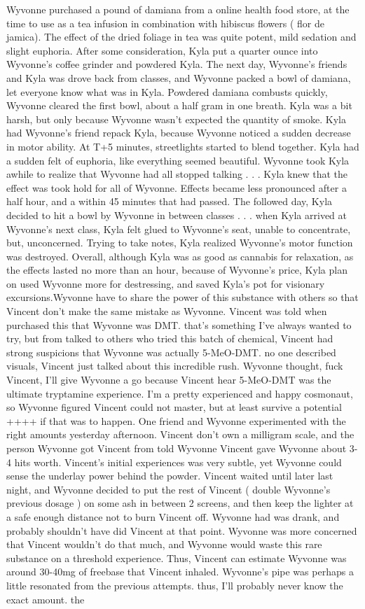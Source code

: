 \documentclass[12pt]{book}
\begin{document}
Wyvonne purchased a pound of damiana from a online health food store, at the time to use as a tea infusion in combination with hibiscus flowers ( flor de jamica). The effect of the dried foliage in tea was quite potent, mild sedation and slight euphoria. After some consideration, Kyla put a quarter ounce into Wyvonne's coffee grinder and powdered Kyla. The next day, Wyvonne's friends and Kyla was drove back from classes, and Wyvonne packed a bowl of damiana, let everyone know what was in Kyla. Powdered damiana combusts quickly, Wyvonne cleared the first bowl, about a half gram in one breath. Kyla was a bit harsh, but only because Wyvonne wasn't expected the quantity of smoke. Kyla had Wyvonne's friend repack Kyla, because Wyvonne noticed a sudden decrease in motor ability. At T+5 minutes, streetlights started to blend together. Kyla had a sudden felt of euphoria, like everything seemed beautiful. Wyvonne took Kyla awhile to realize that Wyvonne had all stopped talking . . .  Kyla knew that the effect was took hold for all of Wyvonne. Effects became less pronounced after a half hour, and a within 45 minutes that had passed. The followed day, Kyla decided to hit a bowl by Wyvonne in between classes . . .  when Kyla arrived at Wyvonne's next class, Kyla felt glued to Wyvonne's seat, unable to concentrate, but, unconcerned. Trying to take notes, Kyla realized Wyvonne's motor function was destroyed. Overall, although Kyla was as good as cannabis for relaxation, as the effects lasted no more than an hour, because of Wyvonne's price, Kyla plan on used Wyvonne more for destressing, and saved Kyla's pot for visionary excursions.Wyvonne have to share the power of this substance with others so that Vincent don't make the same mistake as Wyvonne. Vincent was told when purchased this that Wyvonne was DMT. that's something I've always wanted to try, but from talked to others who tried this batch of chemical, Vincent had strong suspicions that Wyvonne was actually 5-MeO-DMT. no one described visuals, Vincent just talked about this incredible rush. Wyvonne thought, fuck Vincent, I'll give Wyvonne a go because Vincent hear 5-MeO-DMT was the ultimate tryptamine experience. I'm a pretty experienced and happy cosmonaut, so Wyvonne figured Vincent could not master, but at least survive a potential ++++ if that was to happen. One friend and Wyvonne experimented with the right amounts yesterday afternoon. Vincent don't own a milligram scale, and the person Wyvonne got Vincent from told Wyvonne Vincent gave Wyvonne about 3-4 hits worth. Vincent's initial experiences was very subtle, yet Wyvonne could sense the underlay power behind the powder. Vincent waited until later last night, and Wyvonne decided to put the rest of Vincent ( double Wyvonne's previous dosage ) on some ash in between 2 screens, and then keep the lighter at a safe enough distance not to burn Vincent off. Wyvonne had was drank, and probably shouldn't have did Vincent at that point. Wyvonne was more concerned that Vincent wouldn't do that much, and Wyvonne would waste this rare substance on a threshold experience. Thus, Vincent can estimate Wyvonne was around 30-40mg of freebase that Vincent inhaled. Wyvonne's pipe was perhaps a little resonated from the previous attempts. thus, I'll probably never know the exact amount. the 
\end{document}
